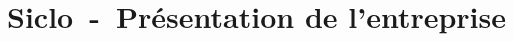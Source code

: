 \documentclass[../main.tex]{subfiles}
\begin{document}
    \part{Siclo~-~Présentation de l'entreprise}
\end{document}

